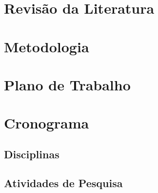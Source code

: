 \documentclass[12pt, a4paper]{article}
\numberwithin{table}{section}
\begin{document}
\section{Revisão da Literatura}
\label{sec:revisao}



\section{Metodologia}
\label{sec:metodologia}


\section{Plano de Trabalho}
\label{sec:plano}

\section{Cronograma}
\label{sec:cronograma}
\subsection{Disciplinas}
\subsection{Atividades de Pesquisa}



\renewcommand\refname{Referências Bibliográficas}
%


\end{document}
